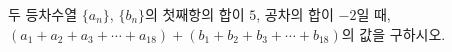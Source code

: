 두 등차수열 $\{a_n\}$, $\{b_n\}$의 첫째항의 합이 $5$, 공차의 합이 $-2$일 때, $(a_1+a_2+a_3+\cdots+a_{18})+(b_1+b_2+b_3+\cdots+b_{18})$의 값을 구하시오.
